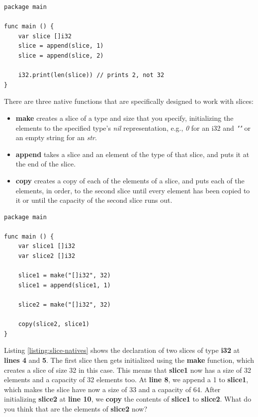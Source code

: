 \documentclass[11pt,fleqn,openany]{book} %
\begin{document}
\begin{lstlisting}[caption={Difference between capacity and size},captionpos=b,label={listing:capacity-size-difference}]
package main

func main () {
	var slice []i32
    slice = append(slice, 1)
    slice = append(slice, 2)
    
    i32.print(len(slice)) // prints 2, not 32
}
\end{lstlisting}

There are three native functions that are specifically designed to work with slices:
\begin{itemize}
    \item \textbf{make} creates a slice of a type and size that you specify, initializing the elements to the specified type's \emph{nil} representation, e.g., \emph{0} for an i32 and \emph{""} or an empty string for an \emph{str}.
    \item \textbf{append} takes a slice and an element of the type of that slice, and puts it at the end of the slice.
    \item \textbf{copy} creates a copy of each of the elements of a slice, and puts each of the elements, in order, to the second slice until every element has been copied to it or until the capacity of the second slice runs out.
\end{itemize}

\begin{lstlisting}[caption={Slice-specific native functions},captionpos=b,label={listing:slice-natives}]
package main

func main () {
	var slice1 []i32
    var slice2 []i32
    
    slice1 = make("[]i32", 32)
    slice1 = append(slice1, 1)
    
    slice2 = make("[]i32", 32)
    
    copy(slice2, slice1)
}
\end{lstlisting}

Listing \ref{listing:slice-natives} shows the declaration of two slices of type \textbf{i32} at \textbf{lines 4} and \textbf{5}. The first slice then gets initialized using the \textbf{make} function, which creates a slice of size 32 in this case. This means that \textbf{slice1} now has a size of 32 elements and a capacity of 32 elements too. At \textbf{line 8}, we append a 1 to \textbf{slice1}, which makes the slice have now a size of 33 and a capacity of 64. After initializing \textbf{slice2} at \textbf{line 10}, we \textbf{copy} the contents of \textbf{slice1} to \textbf{slice2}. What do you think that are the elements of \textbf{slice2} now?
\end{document}
